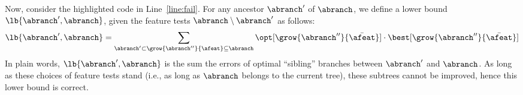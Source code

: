 \documentclass{article}
\begin{document}
%
Now, consider the highlighted code in Line~\ref{line:fail}.
For any ancestor $\abranch'$ of $\abranch$, we define a lower bound $\lb{\abranch',\abranch}$, {given the feature tests} $\abranch \setminus \abranch'$ as follows:
$$
\lb{\abranch',\abranch} = \sum\limits_{\abranch' \subset \grow{\abranch''}{\afeat} \subseteq \abranch}\opt[\grow{\abranch''}{\bar{\afeat}}] \cdot \best[\grow{\abranch''}{\bar{\afeat}}]
$$
In plain words, $\lb{\abranch',\abranch}$ is the sum the errors of optimal ``sibling'' branches between $\abranch'$ and $\abranch$.
As long as these choices of feature tests stand (i.e., as long as $\abranch$ belongs to the current tree), these subtrees cannot be improved, hence this lower bound is correct.


%
\end{document}
